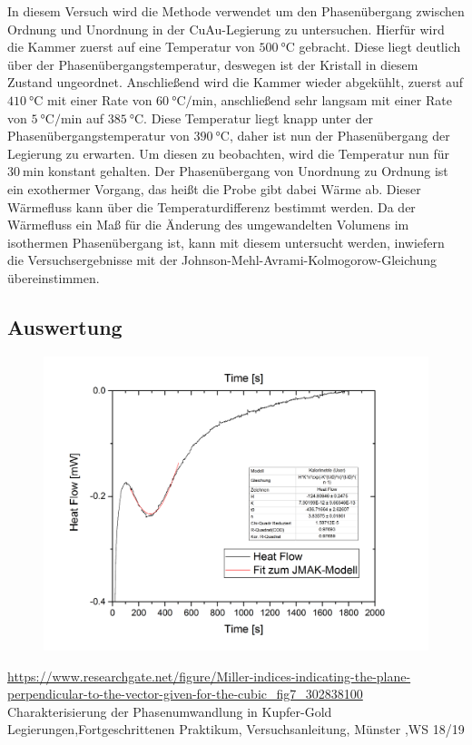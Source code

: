 \documentclass[
	a4paper,
	12pt,
	pagesize,
	ngerman
]{scrartcl}
\begin{document}
In diesem Versuch wird die Methode verwendet um den Phasenübergang zwischen Ordnung und Unordnung in der CuAu-Legierung zu untersuchen. Hierfür wird die Kammer zuerst auf eine Temperatur von $\SI{500}{\degreeCelsius}$ gebracht. Diese liegt deutlich über der Phasenübergangstemperatur, deswegen ist der Kristall in diesem Zustand ungeordnet. Anschließend wird die Kammer wieder abgekühlt, zuerst auf $\SI{410}{\degreeCelsius}$ mit einer Rate von $\SI{60}{\degreeCelsius/\minute}$, anschließend sehr langsam mit einer Rate von $\SI{5}{\degreeCelsius/\minute}$ auf $\SI{385}{\degreeCelsius}$. Diese Temperatur liegt knapp unter der Phasenübergangstemperatur von $\SI{390}{\degreeCelsius}$, daher ist nun der Phasenübergang der Legierung zu erwarten. Um diesen zu beobachten, wird die Temperatur nun für $\SI{30}{\minute}$ konstant gehalten. Der Phasenübergang von Unordnung zu Ordnung ist ein exothermer Vorgang, das heißt die Probe gibt dabei Wärme ab. Dieser Wärmefluss kann über die Temperaturdifferenz bestimmt werden. Da der Wärmefluss ein Maß für die Änderung des umgewandelten Volumens im isothermen Phasenübergang ist, kann mit diesem untersucht werden, inwiefern die Versuchsergebnisse mit der Johnson-Mehl-Avrami-Kolmogorow-Gleichung übereinstimmen.

\subsection{Auswertung}
\begin{figure}[h]
	\centering
	\includegraphics[scale=0.6]{Graph3.png}
	\caption{}
	\label{3}
\end{figure}	

\begin{thebibliography}{9}
 \url{https://www.researchgate.net/figure/Miller-indices-indicating-the-plane-perpendicular-to-the-vector-given-for-the-cubic_fig7_302838100}\\
Charakterisierung der Phasenumwandlung in Kupfer-Gold Legierungen,Fortgeschrittenen Praktikum, Versuchsanleitung, Münster ,WS 18/19

\end{thebibliography}
\end{document}
